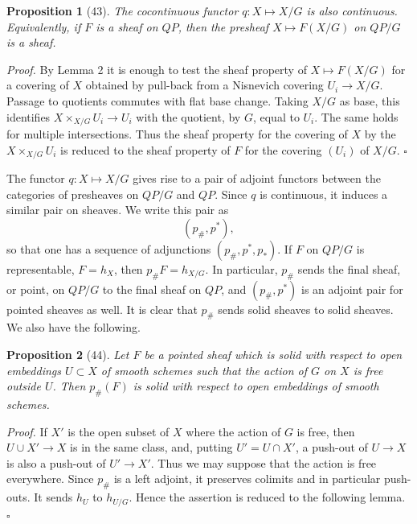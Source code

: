 \documentclass[11pt]{article}
\theoremstyle{deligne}
\newtheorem*{proposition*}{Proposition}
\newenvironment{proofdel}{\noindent\textit{Proof.}}{\hfill$\square$}
\begin{document}
\begin{proposition*}[43]
The cocontinuous functor \(q:X\mapsto X/G\) is also continuous. Equivalently, if \(F\) is a sheaf on \(QP\), then the presheaf \(X\mapsto F(X/G)\) on \(QP/G\) is a sheaf.
\end{proposition*}

\begin{proofdel}
By Lemma 2 it is enough to test the sheaf property of \(X\mapsto F(X/G)\) for a covering of \(X\) obtained by pull-back from a Nisnevich covering \(U_i\to X/G\). Passage to quotients commutes with flat base change. Taking \(X/G\) as base, this identifies \(X\times_{X/G}U_i\to U_i\) with the quotient, by \(G\), equal to \(U_i\). The same holds for multiple intersections. Thus the sheaf property for the covering of \(X\) by the \(X\times_{X/G}U_i\) is reduced to the sheaf property of \(F\) for the covering \((U_i)\) of \(X/G\).
\end{proofdel}

The functor \(q:X\mapsto X/G\) gives rise to a pair of adjoint functors between the categories of presheaves on \(QP/G\) and \(QP\). Since \(q\) is continuous, it induces a similar pair on sheaves. We write this pair as
\[
(p_\#,p^*),
\]
so that one has a sequence of adjunctions \((p_\#,p^*,p_*)\). If \(F\) on \(QP/G\) is representable, \(F=h_X\), then \(p_\#F=h_{X/G}\). In particular, \(p_\#\) sends the final sheaf, or point, on \(QP/G\) to the final sheaf on \(QP\), and \((p_\#,p^*)\) is an adjoint pair for pointed sheaves as well. It is clear that \(p_\#\) sends solid sheaves to solid sheaves. We also have the following.

\begin{proposition*}[44]
Let \(F\) be a pointed sheaf which is solid with respect to open embeddings \(U\subset X\) of smooth schemes such that the action of \(G\) on \(X\) is free outside \(U\). Then \(p_\#(F)\) is solid with respect to open embeddings of smooth schemes.
\end{proposition*}

\begin{proofdel}
If \(X'\) is the open subset of \(X\) where the action of \(G\) is free, then \(U\cup X'\to X\) is in the same class, and, putting \(U'=U\cap X'\), a push-out of \(U\to X\) is also a push-out of \(U'\to X'\). Thus we may suppose that the action is free everywhere. Since \(p_\#\) is a left adjoint, it preserves colimits and in particular push-outs. It sends \(h_U\) to \(h_{U/G}\). Hence the assertion is reduced to the following lemma.
\end{proofdel}
\end{document}
